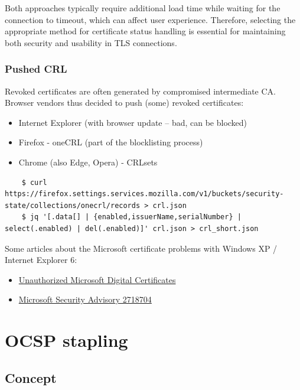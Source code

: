 Both approaches typically require additional load time while waiting for the connection to timeout, which can affect user experience. Therefore, selecting the appropriate method for certificate status handling is essential for maintaining both security and usability in TLS connections.


\subsubsection{Pushed CRL}
Revoked certificates are often generated by compromised intermediate CA. \\
Browser vendors thus decided to push (some) revoked certificates:
\begin{itemize}
    \item Internet Explorer (with browser update – bad, can be blocked)
    \item Firefox - oneCRL (part of the blocklisting process)
    \item Chrome (also Edge, Opera) - CRLsets
\end{itemize}

\begin{verbatim}
    $ curl https://firefox.settings.services.mozilla.com/v1/buckets/security-state/collections/onecrl/records > crl.json
    $ jq '[.data[] | {enabled,issuerName,serialNumber} | select(.enabled) | del(.enabled)]' crl.json > crl_short.json
\end{verbatim}

Some articles about the Microsoft certificate problems with Windows XP / Internet Explorer 6:
\begin{itemize}
    \item \href{https://us-cert.cisa.gov/ncas/current-activity/2012/06/04/Unauthorized-Microsoft-Digital-Certificates}{Unauthorized Microsoft Digital Certificates}
    \item \href{https://docs.microsoft.com/en-us/security-updates/SecurityAdvisories/2012/2718704?redirectedfrom=MSDN}{Microsoft Security Advisory 2718704}
\end{itemize}

\section{OCSP stapling}

\subsection{Concept}

